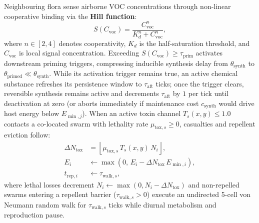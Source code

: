 Neighbouring flora sense airborne VOC concentrations through non-linear cooperative binding via the \textbf{Hill function}:
\begin{equation}
  S(C_{\text{voc}}) = \frac{C_{\text{voc}}^n}{K_d^n + C_{\text{voc}}^n},
  \label{eq:hill_priming_function}
\end{equation}
where $n \in [2, 4]$ denotes cooperativity, $K_d$ is the half-saturation threshold, and $C_{\text{voc}}$ is local signal concentration. Exceeding $S(C_{\text{voc}}) \ge \tau_{\text{prim}}$ activates downstream priming triggers, compressing inducible synthesis delay from $\theta_{\text{synth}}$ to $\theta_{\text{primed}} \ll \theta_{\text{synth}}$. While its activation trigger remains true, an active chemical substance refreshes its persistence window to $\tau_{\text{aft}}$ ticks; once the trigger clears, reversible synthesis remains active and decrements $\tau_{\text{aft}}$ by $1$ per tick until deactivation at zero (or aborts immediately if maintenance cost $c_{\text{synth}}$ would drive host energy below $E_{\min, j}$). When an active toxin channel $T_s(x, y) \le 1.0$ contacts a co-located swarm with lethality rate $\mu_{\text{tox}, s} \ge 0$, casualties and repellent eviction follow:
\begin{align}
  \Delta N_{\text{tox}} &= \left\lfloor \mu_{\text{tox}, s}\,T_s(x, y)\,N_i \right\rfloor, \nonumber \\
  E_i &\gets \max\!\left(0,\, E_i - \Delta N_{\text{tox}}\,E_{\min, i}\right), \nonumber \\
  t_{\text{rep}, i} &\gets \tau_{\text{walk}, s},
  \label{eq:toxin_casualties_repulsion}
\end{align}
where lethal losses decrement $N_i \gets \max(0, N_i - \Delta N_{\text{tox}})$ and non-repelled swarms entering a repellent barrier ($\tau_{\text{walk}, s} > 0$) execute an undirected 5-cell von Neumann random walk for $\tau_{\text{walk}, s}$ ticks while diurnal metabolism and reproduction pause.


